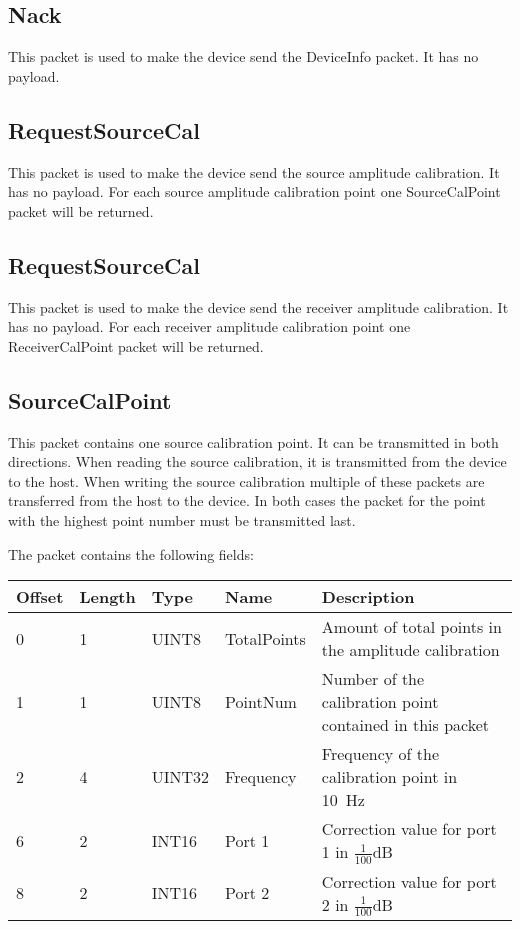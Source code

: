 \documentclass[a4paper,11pt]{article}
\begin{document}
\subsection{Nack}
This packet is used to make the device send the DeviceInfo packet. It has no payload.

\subsection{RequestSourceCal}
This packet is used to make the device send the source amplitude calibration. It has no payload. For each source amplitude calibration point one SourceCalPoint packet will be returned.

\subsection{RequestSourceCal}
This packet is used to make the device send the receiver amplitude calibration. It has no payload. For each receiver amplitude calibration point one ReceiverCalPoint packet will be returned.

\subsection{SourceCalPoint}
This packet contains one source calibration point. It can be transmitted in both directions. When reading the source calibration, it is transmitted from the device to the host. When writing the source calibration multiple of these packets are transferred from the host to the device. In both cases the packet for the point with the highest point number must be transmitted last.

The packet contains the following fields:
\begin{ThreePartTable}
\setlength\tabcolsep{3pt}

\begin{longtable}{p{} |  p{}  |  p{}| p{} | p{}}
\toprule
\textbf{Offset} &\textbf{Length} &\textbf{Type} & \textbf{Name} &\textbf{Description} \\ 
\hline
\endhead
\midrule[\heavyrulewidth]
\endfoot  
\midrule[\heavyrulewidth]
\endlastfoot

0 & 1 & UINT8 & TotalPoints & Amount of total points in the amplitude calibration \\
1 & 1 & UINT8 & PointNum & Number of the calibration point contained in this packet \\
2 & 4 & UINT32 & Frequency & Frequency of the calibration point in \SI{10}{\hertz} \\
6 & 2 & INT16 & Port 1 & Correction value for port 1 in $\frac{1}{100}$dB \\
8 & 2 & INT16 & Port 2 & Correction value for port 2 in $\frac{1}{100}$dB \\
\end{longtable}   
\end{ThreePartTable}
\end{document}
